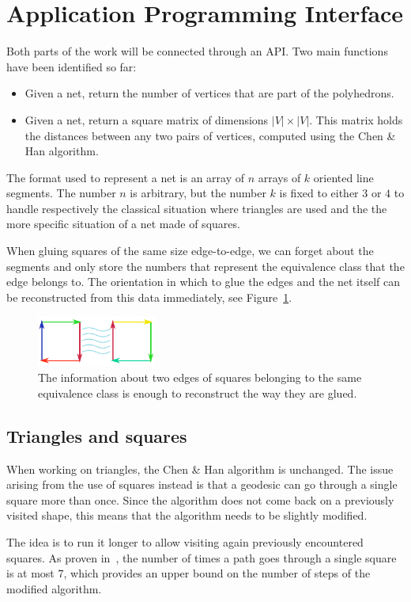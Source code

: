 \section{Application Programming Interface}
Both parts of the work will be connected through an API. Two main functions have been identified so far:
\begin{itemize}
  \item Given a net, return the number of vertices that are part of the polyhedrons.
  \item Given a net, return a square matrix of dimensions $|V|\times|V|$. This matrix holds the distances between any two pairs of vertices, computed using the Chen \& Han algorithm.
\end{itemize}

The format used to represent a net is an array of $n$ arrays of $k$ oriented line segments. The number $n$ is arbitrary, but the number $k$ is fixed to either $3$ or $4$ to handle respectively the classical situation where triangles are used and the the more specific situation of a net made of squares.

When gluing squares of the same size edge-to-edge, we can forget about the segments and only store the numbers that represent the equivalence class that the edge belongs to. The orientation in which to glue the edges and the net itself can be reconstructed from this data immediately, see Figure~\ref{fig:squaresGlue}.

\begin{figure}[h] \centering
	\includegraphics[width=0.35\textwidth]{squares-glue}
	\caption{The information about two edges of squares belonging to the same equivalence class is enough to reconstruct the way they are glued.}
	\label{fig:squaresGlue}
\end{figure}

\subsection{Triangles and squares}
When working on triangles, the Chen \& Han algorithm is unchanged. The issue arising from the use of squares instead is that a geodesic can go through a single square more than once. Since the algorithm does not come back on a previously visited shape, this means that the algorithm needs to be slightly modified.

The idea is to run it longer to allow visiting again previously encountered squares. As proven in~\cite{z-bachthesis}, the number of times a path goes through a single square is at most $7$, which provides an upper bound on the number of steps of the modified algorithm.
